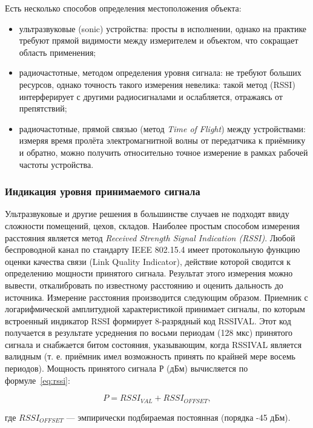 Есть несколько способов определения местоположения объекта:

\begin{itemize}
    \item ультразвуковые (sonic) устройства: просты в исполнении, однако на практике требуют прямой видимости между измерителем и объектом, что сокращает область применения;
    \item радиочастотные, методом определения уровня сигнала: не требуют больших ресурсов, однако точность такого измерения невелика: такой метод (RSSI) интерферирует с другими радиосигналами и ослабляется, отражаясь от препятствий;
    \item радиочастотные, прямой связью (метод \textit{Time of Flight}) между устройствами: измеряя время пролёта электромагнитной волны от передатчика к приёмнику и обратно, можно получить относительно точное измерение в рамках рабочей частоты устройства.
\end{itemize}

\subsubsection{Индикация уровня принимаемого сигнала}

Ультразвуковые и другие решения в большинстве случаев не подходят ввиду сложности помещений, цехов, складов. Наиболее простым способом измерения расстояния является метод \textit{Received Strength Signal Indication (RSSI)}. Любой беспроводной канал по стандарту IEEE 802.15.4 имеет протокольную функцию оценки качества связи (Link Quality Indicator), действие которой сводится к определению мощности принятого сигнала. Результат этого измерения можно вывести, откалибровать по известному расстоянию и оценить дальность до источника. Измерение расстояния производится следующим образом. Приемник с логарифмической амплитудной характеристикой принимает сигналы, по которым встроенный индикатор RSSI формирует 8-разрядный код RSSIVAL. Этот код получается в результате усреднения по восьми периодам (128 мкс) принятого сигнала и снабжается битом состояния, указывающим, когда RSSIVAL является валидным (т. е. приёмник имел возможность принять по крайней мере восемь периодов). Мощность принятого сигнала Р (дБм) вычисляется по формуле~\eqref{eq:rssi}:

\begin{equation}
    \label{eq:rssi}
    P = RSSI_{VAL} + RSSI_{OFFSET},
\end{equation}

где $RSSI_{OFFSET}$ — эмпирически подбираемая постоянная (порядка -45 дБм).

